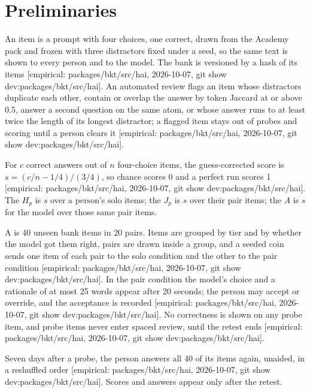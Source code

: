 \documentclass[11pt]{article}
\newcommand{\emp}[1]{\textcolor{bucketgray}{\footnotesize [empirical: #1]}}
\newcommand{\hai}{\emp{packages/bkt/src/hai, 2026-10-07, git show dev:packages/bkt/src/hai}}
\begin{document}
\section{Preliminaries}
\label{sec:prelim}

\begin{definition}
\label{def:bank}
An item is a prompt with four choices, one correct, drawn from the Academy pack and frozen with three distractors fixed under a seed, so the same text is shown to every person and to the model. The bank is versioned by a hash of its items \hai. An automated review flags an item whose distractors duplicate each other, contain or overlap the answer by token Jaccard at or above 0.5, answer a second question on the same atom, or whose answer runs to at least twice the length of its longest distractor; a flagged item stays out of probes and scoring until a person clears it \hai.
\end{definition}

\begin{definition}[Scores]
\label{def:scores}
For $c$ correct answers out of $n$ four-choice items, the guess-corrected score is $s = (c/n - 1/4)/(3/4)$, so chance scores 0 and a perfect run scores 1 \hai. The  $H_p$ is $s$ over a person's solo items; the  $J_p$ is $s$ over their pair items; the  $A$ is $s$ for the model over those same pair items.
\end{definition}

\begin{definition}[Probe]
\label{def:probe}
A  is 40 unseen bank items in 20 pairs. Items are grouped by tier and by whether the model got them right, pairs are drawn inside a group, and a seeded coin sends one item of each pair to the solo condition and the other to the pair condition \hai. In the pair condition the model's choice and a rationale of at most 25 words appear after 20 seconds; the person may accept or override, and the acceptance is recorded \hai. No correctness is shown on any probe item, and probe items never enter spaced review, until the retest ends \hai.
\end{definition}

\begin{definition}[Retest]
\label{def:retest}
Seven days after a probe, the person answers all 40 of its items again, unaided, in a reshuffled order \hai. Scores and answers appear only after the retest.
\end{definition}
\end{document}
